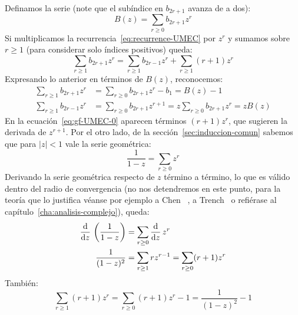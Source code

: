   Definamos la serie
  (note que el subíndice en \(b_{2 r + 1}\) avanza de a dos):
  \begin{equation}
    \label{eq:gf-UMEC}
    B(z) = \sum_{r \ge 0} b_{2 r + 1} z^r
  \end{equation}
  Si multiplicamos la recurrencia~\eqref{eq:recurrence-UMEC}
  por \(z^r\)
  y sumamos sobre \(r \ge 1\)
  (para considerar solo índices positivos)
  queda:
  \begin{equation}
    \label{eq:gf-UMEC-0}
    \sum_{r \ge 1} b_{2 r + 1} z^r
       = \sum_{r \ge 1} b_{2 r - 1} z^r
	   + \sum_{r \ge 1} (r + 1) z^r
  \end{equation}
  Expresando lo anterior en términos de \(B(z)\),
  reconocemos:
  \begin{align}
    \sum_{r \ge 1} b_{2 r + 1} z^r
      &= \sum_{r \ge 0} b_{2 r + 1} z^r - b_1
       = B(z) - 1 \label{eq:suma-b(2r+1)} \\
    \sum_{r \ge 1} b_{2 r - 1} z^r
      &= \sum_{r \ge 0} b_{2 r + 1} z^{r + 1}
       = z \sum_{r \ge 0} b_{2 r + 1} z^r
       = z B(z) \label{eq:suma-b(2r-1)}
  \end{align}
  En la ecuación~\eqref{eq:gf-UMEC-0}
  aparecen términos \((r + 1) z^r\),
  que sugieren la derivada de \(z^{r + 1}\).
  Por el otro lado,
  de la sección~\ref{sec:induccion-comun}
  sabemos que para \(\lvert z \rvert < 1\) vale la serie geométrica:
  \begin{equation}
    \label{eq:serie-geometrica}
    \frac{1}{1 - z} = \sum_{r \ge 0} z^r
  \end{equation}
  Derivando la serie geométrica respecto de \(z\) término a término,
  lo que es válido dentro del radio de convergencia%
  (no nos detendremos en este punto,
   para la teoría que lo justifica véanse por ejemplo a Chen~%
    \cite{chen08:_fundam_analy},
   a Trench~\cite{trench13:_introd_real_analy}
   o refiérase al capítulo~\ref{cha:analisis-complejo}),
  queda:
  \begin{align}
    \frac{\mathrm{d}}{\mathrm{d} z}
      \, \left( \frac{1}{1 - z} \right)
      &= \sum_{r \ge 0} \frac{\mathrm{d}}{\mathrm{d} z} \, z^r
	   \notag \\
    \frac{1}{(1 - z)^2}
      &= \sum_{r \ge 1} r z^{r - 1}
       = \sum_{r \ge 0} (r + 1) z^r
	   \label{eq:D-serie-geometrica}
  \end{align}
  También:
  \begin{equation}
    \label{eq:suma-r+1}
    \sum_{r \ge 1} (r + 1) z^r
       = \sum_{r \ge 0} (r + 1) z^r - 1
       = \frac{1}{(1 - z)^2} - 1
  \end{equation}

